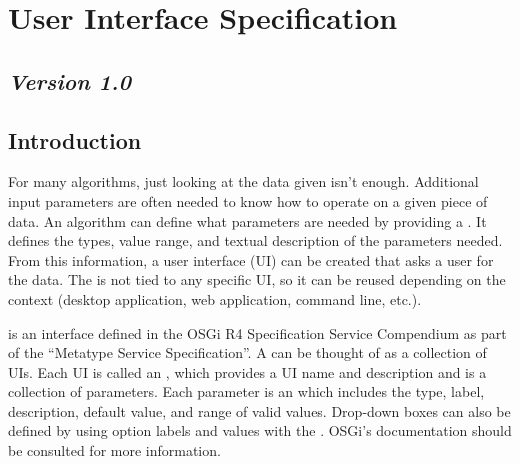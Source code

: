 %

\section{User Interface Specification}
\label{GUISpec}
\subsection*{\textit{Version 1.0}}
\subsection{Introduction}

For many algorithms, just looking at the data given isn't enough. Additional
input parameters are often needed to know how to operate on a given piece of
data. An algorithm can define what parameters are needed by providing a
. It defines the types, value range, and textual
description of the parameters needed. From this information, a user interface
(UI) can be created that asks a user for the data. The 
is not tied to any specific UI, so it can be reused depending on the context
(desktop application, web application, command line, etc.).

 is an interface defined in the OSGi R4 Specification
Service Compendium as part of the ``Metatype Service Specification''. A
 can be thought of as a collection of UIs. Each UI is
called an , which provides a UI name and description
and is a collection of parameters. Each parameter is an
 which includes the type, label, description, default
value, and range of valid values. Drop-down boxes can also be defined by using
option labels and values with the . OSGi's
documentation should be consulted for more information.

